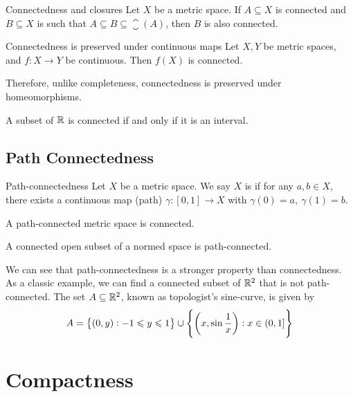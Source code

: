 \documentclass{styles/tufte}
\begin{document}
\begin{lemma}{Connectedness and closures}{}
  Let $X$ be a metric space. If $A \subseteq X$ is connected and $B \subseteq X$ is such that $A \subseteq B \subseteq \closure(A)$, then $B$ is also connected.
\end{lemma}

\begin{lemma}{Connectedness is preserved under continuous maps}{}
  Let $X, Y$ be metric spaces, and $f: X \to Y$ be continuous. Then $f(X)$ is connected.
\end{lemma}

Therefore, unlike completeness, connectedness is preserved under homeomorphisms.

\begin{theorem}{}{}
  A subset of $\mathbb{R}$ is connected if and only if it is an interval.
\end{theorem}


\subsection{Path Connectedness}
  
  \begin{definition}{Path-connectedness}{}
    Let $X$ be a metric space. We say $X$ is  if for any $a, b \in X$, there exists a continuous map (path) $\gamma: [0, 1] \to X$ with $\gamma(0) = a,\ \gamma(1) = b$.
  \end{definition}
  
  \begin{theorem}{}{}
    A path-connected metric space is connected.
  \end{theorem}
  
  \begin{theorem}{}{}
    A connected open subset of a normed space is path-connected.
  \end{theorem}
  
  We can see that path-connectedness is a stronger property than connectedness. As a classic example, we can find a connected subset of $\mathbb{R}^2$ that is not path-connected. The set $A \subseteq \mathbb{R}^2$, known as topologist's sine-curve, is given by
  \[ A = \set{(0, y): -1 \leqslant y \leqslant 1} \cup \set{\left(x, \sin\frac{1}{x}\right): x \in (0, 1]} \]




\section{Compactness}
  
\end{document}
